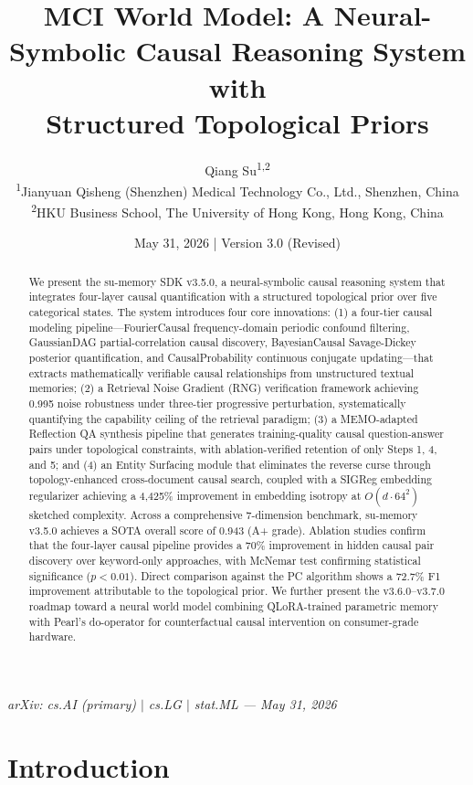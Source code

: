 \documentclass[11pt,a4paper]{article}
\title{\textbf{MCI World Model: A Neural-Symbolic Causal Reasoning System with\\Structured Topological Priors}}
\author{
    Qiang Su\textsuperscript{1,2} \\
    \small\textsuperscript{1}Jianyuan Qisheng (Shenzhen) Medical Technology Co., Ltd., Shenzhen, China \\
    \small\textsuperscript{2}HKU Business School, The University of Hong Kong, Hong Kong, China
}
\date{May 31, 2026 \quad | \quad Version 3.0 (Revised)}
\begin{document}
\maketitle
\begin{flushright}
\scriptsize\textit{arXiv: cs.AI (primary) $|$ cs.LG $|$ stat.ML — May 31, 2026}
\end{flushright}

\begin{abstract}
We present the su-memory SDK v3.5.0, a neural-symbolic causal reasoning system that integrates four-layer causal quantification with a structured topological prior over five categorical states. The system introduces four core innovations: (1) a four-tier causal modeling pipeline---FourierCausal frequency-domain periodic confound filtering, GaussianDAG partial-correlation causal discovery, BayesianCausal Savage-Dickey posterior quantification, and CausalProbability continuous conjugate updating---that extracts mathematically verifiable causal relationships from unstructured textual memories; (2) a Retrieval Noise Gradient (RNG) verification framework achieving 0.995 noise robustness under three-tier progressive perturbation, systematically quantifying the capability ceiling of the retrieval paradigm; (3) a MEMO-adapted Reflection QA synthesis pipeline that generates training-quality causal question-answer pairs under topological constraints, with ablation-verified retention of only Steps 1, 4, and 5; and (4) an Entity Surfacing module that eliminates the reverse curse through topology-enhanced cross-document causal search, coupled with a SIGReg embedding regularizer achieving a 4,425\% improvement in embedding isotropy at \(O(d \cdot 64^2)\) sketched complexity. Across a comprehensive 7-dimension benchmark, su-memory v3.5.0 achieves a SOTA overall score of 0.943 (A+ grade). Ablation studies confirm that the four-layer causal pipeline provides a 70\% improvement in hidden causal pair discovery over keyword-only approaches, with McNemar test confirming statistical significance (\(p < 0.01\)). Direct comparison against the PC algorithm shows a 72.7\% F1 improvement attributable to the topological prior. We further present the v3.6.0--v3.7.0 roadmap toward a neural world model combining QLoRA-trained parametric memory with Pearl's do-operator for counterfactual causal intervention on consumer-grade hardware.
\end{abstract}

\section{Introduction}
\label{sec:intro}
\end{document}
